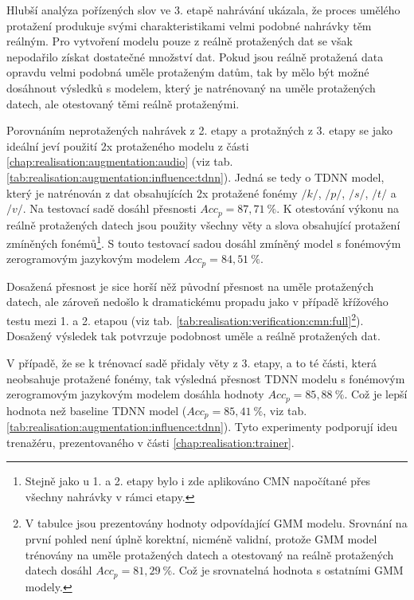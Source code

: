 Hlubší analýza pořízených slov ve 3. etapě nahrávání ukázala, že proces umělého protažení produkuje svými charakteristikami velmi podobné nahrávky těm reálným. Pro vytvoření modelu pouze z reálně protažených dat se však nepodařilo získat dostatečné množství dat. Pokud jsou reálně protažená data opravdu velmi podobná uměle protaženým datům, tak by mělo být možné dosáhnout  výsledků s modelem, který je natrénovaný na uměle protažených datech, ale otestovaný těmi reálně protaženými.

Porovnáním neprotažených nahrávek z 2. etapy a protažných z 3. etapy se jako ideální jeví použití 2x protaženého modelu z části \ref{chap:realisation:augmentation:audio} (viz tab. \ref{tab:realisation:augmentation:influence:tdnn}). Jedná se tedy o TDNN model, který je natrénován z dat obsahujících 2x protažené fonémy $/k/$, $/p/$, $/s/$, $/t/$ a $/v/$.  Na testovací sadě dosáhl přesnosti $Acc_{p} = 87,71\ \%$. K otestování výkonu na reálně protažených datech jsou použity všechny věty a slova obsahující protažení zmíněných fonémů\footnote{Stejně jako u 1. a 2. etapy bylo i zde aplikováno CMN napočítané přes všechny nahrávky v rámci etapy.}. S touto testovací sadou dosáhl zmíněný model s fonémovým zerogramovým jazykovým modelem $Acc_{p} = 84,51\ \%$.

Dosažená přesnost je sice horší něž původní přesnost na uměle protažených datech, ale zároveň nedošlo k dramatickému propadu jako v případě křížového testu mezi 1. a 2. etapou (viz tab. \ref{tab:realisation:verification:cmn:full}\footnote{V tabulce jsou prezentovány hodnoty odpovídající GMM modelu. Srovnání na první pohled není úplně korektní, nicméně validní, protože GMM model trénovány na uměle protažených datech a otestovaný na reálně protažených datech dosáhl $Acc_{p} = 81,29\ \%$. Což je srovnatelná hodnota s ostatními GMM modely.}). Dosažený výsledek tak potvrzuje podobnost uměle a reálně protažených dat.

V případě, že se k trénovací sadě přidaly věty z 3. etapy, a to té části, která neobsahuje protažené fonémy, tak výsledná přesnost TDNN modelu s fonémovým zerogramovým jazykovým modelem dosáhla hodnoty $Acc_{p} = 85,88\ \%$. Což je lepší hodnota než baseline TDNN model ($Acc_{p} = 85,41\ \%$, viz tab. \ref{tab:realisation:augmentation:influence:tdnn}). Tyto experimenty podporují ideu trenažéru, prezentovaného v části \ref{chap:realisation:trainer}.
